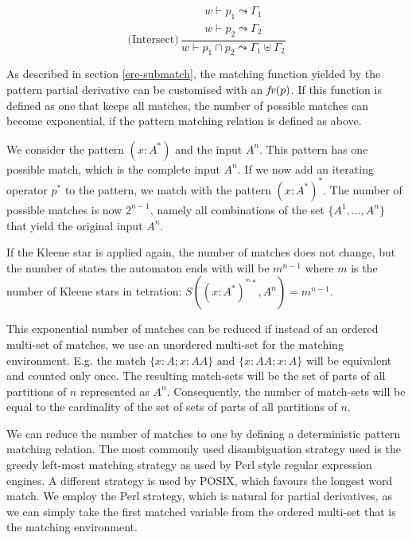 \begin{defn}
   \[\text{(Intersect)}\, \frac
      {\begin{array}{c}
         w \vdash p_1 \leadsto \Gamma_1 \\
         w \vdash p_2 \leadsto \Gamma_2
      \end{array}}     
      {w \vdash p_1 \cap p_2 \leadsto \Gamma_1 \uplus \Gamma_2}
   \]

\end{defn}

As described in section \ref{ere-submatch}, the matching function yielded by the
pattern partial derivative can be customised with an $\iteratefvp$. If this
function is defined as one that keeps all matches, the number of possible
matches can become exponential, if the pattern matching relation is defined as
above.

We consider the pattern $(x:A^*)$ and the input $A^n$. This pattern has one
possible match, which is the complete input $A^n$. If we now add an iterating
operator $p^*$ to the pattern, we match with the pattern $(x:A^*)^*$. The number
of possible matches is now $2^{n-1}$, namely all combinations of the set $\{
A^1, \dots, A^n \}$ that yield the original input $A^n$.

If the Kleene star is applied again, the number of matches does not change, but
the number of states the automaton ends with will be $m^{n-1}$ where $m$ is the
number of Kleene stars in tetration: $S((x:A^*)^{^m*}, A^n) = m^{n-1}$.

This exponential number of matches can be reduced if instead of an ordered
multi-set of matches, we use an unordered multi-set for the matching
environment. E.g. the match $\{ x:A; x:AA \}$ and $\{ x:AA; x:A \}$ will be
equivalent and counted only once. The resulting match-sets will be the set of
parts of all partitions of $n$ represented as $A^n$. Consequently, the number of
match-sets will be equal to the cardinality of the set of sets of parts of all
partitions of $n$. %

We can reduce the number of matches to one by defining a deterministic pattern
matching relation. The most commonly used disambiguation strategy used is the
greedy left-most matching strategy as used by Perl style regular expression
engines. A different strategy is used by POSIX, which favours the longest word
match. We employ the Perl strategy, which is natural for partial derivatives, as
we can simply take the first matched variable from the ordered multi-set that is
the matching environment.


